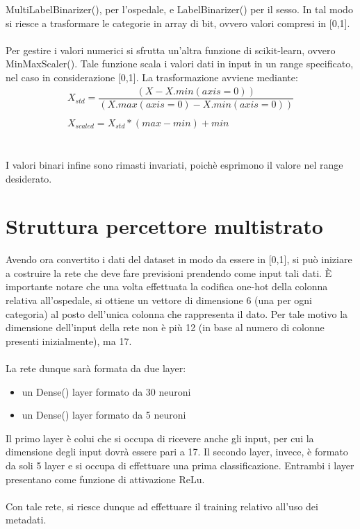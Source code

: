 MultiLabelBinarizer(), per l'ospedale, e LabelBinarizer() per il sesso. In tal modo si riesce a trasformare le categorie in array di 
bit, ovvero valori compresi in [0,1].
\\\\
Per gestire i valori numerici si sfrutta un'altra funzione di scikit-learn, ovvero MinMaxScaler().
Tale funzione scala i valori dati in input in un range specificato, nel caso in considerazione [0,1].
La trasformazione avviene mediante:
\begin{equation*}
    \begin{array}{l}
        X_{std} = \dfrac{(X - X.min(axis=0))}  {(X.max(axis=0) - X.min(axis=0))} \\\\
        X_{scaled} = X_{std} * (max - min) + min
    \end{array}
\end{equation*}
\\\\
I valori binari infine sono rimasti invariati, poichè esprimono il valore nel range desiderato.

\section{Struttura percettore multistrato}

Avendo ora convertito i dati del dataset in modo da essere in [0,1], si può iniziare a costruire la rete che deve fare previsioni 
prendendo come input tali dati. 
È importante notare che una volta effettuata la codifica one-hot della colonna relativa all'ospedale, si ottiene un vettore di dimensione 6 (una per ogni categoria) al 
posto dell'unica colonna che rappresenta il dato. Per tale motivo la dimensione dell'input della rete non è 
più 12 (in base al numero di colonne presenti inizialmente), ma 17.
\\\\
La rete dunque sarà formata da due layer:
\begin{itemize}
    \item un Dense() layer formato da 30 neuroni
    \item un Dense() layer formato da 5 neuroni
\end{itemize}
Il primo layer è colui che si occupa di ricevere anche gli input, per cui la dimensione degli input dovrà essere pari a 17.
Il secondo layer, invece, è formato da soli 5 layer e si occupa di effettuare una prima classificazione.
Entrambi i layer presentano come funzione di attivazione ReLu.
\\\\
Con tale rete, si riesce dunque ad effettuare il training relativo all'uso dei metadati.

